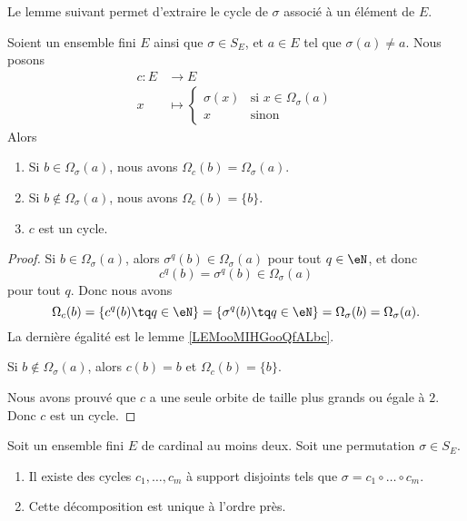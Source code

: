 Le lemme suivant permet d'extraire le cycle de \( \sigma\) associé à un élément de \( E\).
\begin{lemma}        \label{LEMooFFTBooCZsaFu}
	Soient un ensemble fini \( E\) ainsi que \( \sigma\in S_E\), et \( a\in E\) tel que \( \sigma(a)\neq a\). Nous posons
	\begin{equation}
		\begin{aligned}
			c\colon E & \to E                                                  \\
			x         & \mapsto \begin{cases}
				                    \sigma(x) & \text{si } x\in \Omega_{\sigma}(a) \\
				                    x         & \text{sinon }
			                    \end{cases}
		\end{aligned}
	\end{equation}
	Alors
	\begin{enumerate}
		\item
		      Si \( b\in \Omega_{\sigma}(a)\), nous avons \( \Omega_{c}(b)=\Omega_{\sigma}(a)\).
		\item
		      Si \( b\notin \Omega_{\sigma}(a)\), nous avons \( \Omega_{c}(b)=\{ b \}\).
		\item
		      \( c\) est un cycle.
	\end{enumerate}
\end{lemma}

\begin{proof}
	Si \( b\in \Omega_{\sigma}(a)\), alors \( \sigma^q(b)\in \Omega_{\sigma}(a)\) pour tout \( q\in \eN\), et donc
	\begin{equation}
		c^q(b)=\sigma^q(b)\in\Omega_{\sigma}(a)
	\end{equation}
	pour tout \( q\). Donc nous avons
	\begin{equation}
		\Omega_c(b)=\{ c^q(b)\tq q\in \eN \}=\{ \sigma^q(b)\tq q\in \eN \}=\Omega_{\sigma}(b)=\Omega_{\sigma}(a).
	\end{equation}
	La dernière égalité est le lemme \ref{LEMooMIHGooQfALbc}.

	Si \( b\notin\Omega_{\sigma}(a)\), alors \( c(b)=b\) et \( \Omega_c(b)=\{ b \}\).

	Nous avons prouvé que \( c\) a une seule orbite de taille plus grands ou égale à \( 2\). Donc \( c\) est un cycle.
\end{proof}


\begin{theorem}
	Soit un ensemble fini \( E\) de cardinal au moins deux. Soit une permutation \( \sigma\in S_E\).
	\begin{enumerate}
		\item Il existe des cycles \( c_1,\ldots, c_m\) à support disjoints tels que \( \sigma=c_1\circ\ldots \circ c_m\).
		\item
		      Cette décomposition est unique à l'ordre près.
	\end{enumerate}
\end{theorem}

